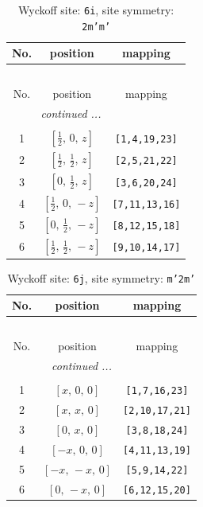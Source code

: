 \documentclass[fleqn,8pt]{jsarticle}
\begin{document}
\renewcommand{\arraystretch}{1.2}
\begin{longtable}{ccc}
\caption{Wyckoff site: {\tt 6i}, site symmetry: {\tt 2m'm'}}
 \\
 \hline \hline
No. & position & mapping \\ \hline \endfirsthead

\multicolumn{2}{l}{\tablename\ \thetable{}} \\
 \hline \hline
No. & position & mapping \\ \hline \endhead

 \hline \hline
\multicolumn{2}{r}{\footnotesize\it continued ...} \\ \endfoot

 \hline \hline
\multicolumn{2}{r}{} \\ \endlastfoot

1 & $\left[ \frac{1}{2},\, 0,\, z \right]$ & {\tt [1,4,19,23]} \\ \hline
2 & $\left[ \frac{1}{2},\, \frac{1}{2},\, z \right]$ & {\tt [2,5,21,22]} \\ \hline
3 & $\left[ 0,\, \frac{1}{2},\, z \right]$ & {\tt [3,6,20,24]} \\ \hline
4 & $\left[ \frac{1}{2},\, 0,\, - z \right]$ & {\tt [7,11,13,16]} \\ \hline
5 & $\left[ 0,\, \frac{1}{2},\, - z \right]$ & {\tt [8,12,15,18]} \\ \hline
6 & $\left[ \frac{1}{2},\, \frac{1}{2},\, - z \right]$ & {\tt [9,10,14,17]} \\
\end{longtable}
\renewcommand{\arraystretch}{1.2}
\begin{longtable}{ccc}
\caption{Wyckoff site: {\tt 6j}, site symmetry: {\tt m'2m'}}
 \\
 \hline \hline
No. & position & mapping \\ \hline \endfirsthead

\multicolumn{2}{l}{\tablename\ \thetable{}} \\
 \hline \hline
No. & position & mapping \\ \hline \endhead

 \hline \hline
\multicolumn{2}{r}{\footnotesize\it continued ...} \\ \endfoot

 \hline \hline
\multicolumn{2}{r}{} \\ \endlastfoot

1 & $\left[ x,\, 0,\, 0 \right]$ & {\tt [1,7,16,23]} \\ \hline
2 & $\left[ x,\, x,\, 0 \right]$ & {\tt [2,10,17,21]} \\ \hline
3 & $\left[ 0,\, x,\, 0 \right]$ & {\tt [3,8,18,24]} \\ \hline
4 & $\left[ - x,\, 0,\, 0 \right]$ & {\tt [4,11,13,19]} \\ \hline
5 & $\left[ - x,\, - x,\, 0 \right]$ & {\tt [5,9,14,22]} \\ \hline
6 & $\left[ 0,\, - x,\, 0 \right]$ & {\tt [6,12,15,20]} \\
\end{longtable}
\end{document}
